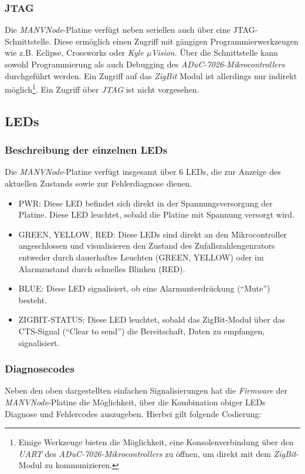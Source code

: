 \subsubsection{JTAG}
Die \emph{MANVNode}-Platine verfügt neben seriellen auch über eine JTAG-Schnittstelle. Diese ermöglich einen Zugriff mit
gängigen Programmierwerkzeugen wie z.B. Eclipse, Crossworks oder \emph{Kyle $\mu{}$Vision.}
Über die Schnittstelle kann sowohl Programmierung als auch Debugging des \emph{ADuC-7026-Mikrocontrollers}
durchgeführt werden. Ein Zugriff auf das \emph{ZigBit} Modul ist allerdings nur indirekt 
möglich\footnote{Einige Werkzeuge bieten die Möglichkeit, eine Konsolenverbindung
über den \emph{UART} des \emph{ADuC-7026-Mikrocontrollers} zu öffnen, um direkt mit dem \emph{ZigBit}-Modul zu
    kommunizieren.}.  Ein Zugriff über \emph{JTAG} ist nicht vorgesehen.

\subsection{LEDs}

\subsubsection{Beschreibung der einzelnen LEDs}
Die \emph{MANVNode}-Platine verfügt insgesamt über 6 LEDs, die zur Anzeige des aktuellen Zustands sowie zur Fehlerdiagnose dienen.
\begin{itemize}
    \item{PWR:} Diese LED befindet sich direkt in der Spannungsversorgung der Platine. Diese LED leuchtet, sobald
                die Platine mit Spannung versorgt wird. 
    \item{GREEN, YELLOW, RED}: Diese LEDs sind direkt an den Mikrocontroller angeschlossen und visualisieren den Zustand des
                               Zufallszahlengenrators entweder durch dauerhaftes Leuchten (GREEN, YELLOW) oder im Alarmzustand
                               durch schnelles Blinken (RED). 
    \item{BLUE}: Diese LED signalisiert, ob eine Alarmunterdrückung ("`Mute"') besteht.
    \item{ZIGBIT-STATUS}: Diese LED leuchtet, sobald das ZigBit-Modul über das CTS-Signal ("`Clear to send"') die Bereitschaft, 
                          Daten zu empfangen, signalisiert.
\end{itemize}
                 
    

\subsubsection{Diagnosecodes}
Neben den oben dargestellten einfachen Signalisierungen hat die \emph{Firmware} der \emph{MANVNode}-Platine die 
Möglichkeit, über die Kombination obiger LEDs Diagnose und Fehlercodes auszugeben. Hierbei gilt folgende Codierung:

